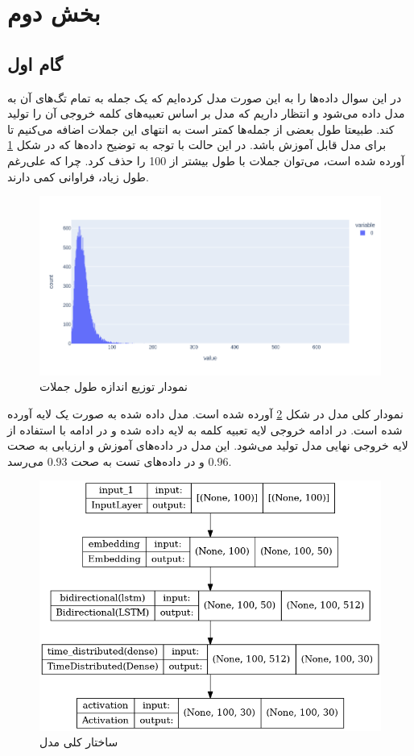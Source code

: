 \documentclass[12pt, a4paper]{article}
\begin{document}
\pagebreak

\section*{بخش دوم}

\subsection*{گام اول}

در این سوال داده‌ها را به این صورت مدل کرده‌ایم که یک جمله به تمام تگ‌های  آن
به مدل داده می‌شود و انتظار داریم که مدل بر اساس تعبیه‌های کلمه خروجی  آن را تولید کند.
طبیعتا طول بعضی از جمله‌ها کمتر است به انتهای این جملات  اضافه می‌کنیم تا برای مدل
قابل آموزش باشد. در این حالت با توجه به توضیح داده‌ها که در شکل \ref{sentence_len_dist} آورده شده است،
می‌توان جملات با طول بیشتر از 100 را حذف کرد. چرا که علی‌رغم طول زیاد، فراوانی کمی دارند.

\begin{figure}[h]
    \centering
    \includegraphics[width=0.8\linewidth]{images/distribution.png}
    \caption{نمودار توزیع اندازه طول جملات}
    \label{sentence_len_dist}
\end{figure}

نمودار کلی مدل در شکل \ref{lstm_architecture} آورده شده است. مدل  داده شده به صورت یک لایه
 آورده شده است. در ادامه خروجی لایه‌ تعبیه کلمه به لایه  داده شده و در ادامه با
استفاده از لایه  خروجی نهایی مدل تولید می‌شود. این مدل در داده‌های آموزش و ارزیابی به صحت
$0.96$ و در داده‌های تست به صحت $0.93$ می‌رسد.

\begin{figure}[h]
    \centering
    \includegraphics[width=0.8\linewidth]{images/architecture.png}
    \caption{ساختار کلی مدل }
    \label{lstm_architecture}
\end{figure}
\end{document}
